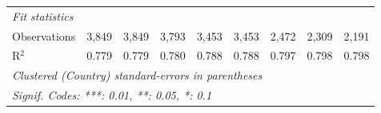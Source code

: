 \begin{tabular}{lcccccccc}
   \midrule \emph{Fit statistics}\\
   Observations                                                                   & 3,849   & 3,849   & 3,793   & 3,453        & 3,453        & 2,472        & 2,309         & 2,191\\  
   R$^2$                                                                          & 0.779   & 0.779   & 0.780   & 0.788        & 0.788        & 0.797        & 0.798         & 0.798\\  
   \midrule
   \multicolumn{9}{l}{\emph{Clustered (Country) standard-errors in parentheses}}\\
   \multicolumn{9}{l}{\emph{Signif. Codes: ***: 0.01, **: 0.05, *: 0.1}}\\
\end{tabular}
\par\endgroup


